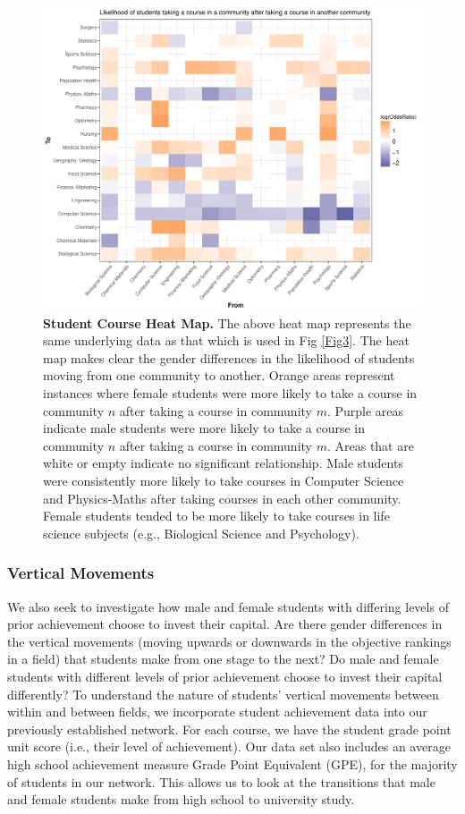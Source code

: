 \begin{figure}[!ht]
\centering
\includegraphics[width = \linewidth]{C3 - Bourdieu Networks/C3 - Fig4.pdf}
\caption{\textbf{Student Course Heat Map.\newline} 
The above heat map represents the same underlying data as that which is used in Fig \ref{Fig3}. The heat map makes clear the gender differences in the likelihood of students moving from one community to another. Orange areas represent instances where female students were more likely to take a course in community $n$ after taking a course in community $m$. Purple areas indicate male students were more likely to take a course in community $n$ after taking a course in community $m$. Areas that are white or empty indicate no significant relationship. Male students were consistently more likely to take courses in Computer Science and Physics-Maths after taking courses in each other community. Female students tended to be more likely to take courses in life science subjects (e.g., Biological Science and Psychology). }
\label{Fig4}
\end{figure}

\subsubsection{Vertical Movements}
We also seek to investigate how male and female students with differing levels of prior achievement choose to invest their capital. Are there gender differences in the vertical movements (moving upwards or downwards in the objective rankings in a field) that students make from one stage to the next? Do male and female students with different levels of prior achievement choose to invest their capital differently? To understand the nature of students' vertical movements between within and between fields, we incorporate student achievement data into our previously established network. For each course, we have the student grade point unit score (i.e., their level of achievement). Our data set also includes an average high school achievement measure Grade Point Equivalent (GPE), for the majority of students in our network. This allows us to look at the transitions that male and female students make from high school to university study. 

